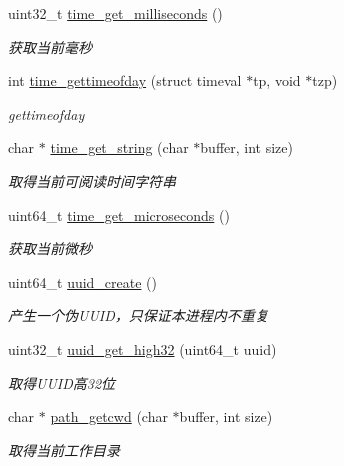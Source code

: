 \begin{DoxyCompactItemize}
uint32\+\_\+t \hyperlink{a00099_a528d27a7218cb2fdabf81ca343e24fc9_a528d27a7218cb2fdabf81ca343e24fc9}{time\+\_\+get\+\_\+milliseconds} ()
\begin{DoxyCompactList}\small\item\em 获取当前毫秒 \end{DoxyCompactList}\item 
int \hyperlink{a00099_a3cab12b4908938ca999206a67c8ee032_a3cab12b4908938ca999206a67c8ee032}{time\+\_\+gettimeofday} (struct timeval $\ast$tp, void $\ast$tzp)
\begin{DoxyCompactList}\small\item\em gettimeofday \end{DoxyCompactList}\item 
char $\ast$ \hyperlink{a00099_a6d3f7fda67a3c61f767f7b2dbfcbe4ee_a6d3f7fda67a3c61f767f7b2dbfcbe4ee}{time\+\_\+get\+\_\+string} (char $\ast$buffer, int size)
\begin{DoxyCompactList}\small\item\em 取得当前可阅读时间字符串 \end{DoxyCompactList}\item 
uint64\+\_\+t \hyperlink{a00099_a5eb6de730bc28be3fbc402b9841c1819_a5eb6de730bc28be3fbc402b9841c1819}{time\+\_\+get\+\_\+microseconds} ()
\begin{DoxyCompactList}\small\item\em 获取当前微秒 \end{DoxyCompactList}\item 
uint64\+\_\+t \hyperlink{a00099_a2b1df51bc127460a3bf25949068bfe92_a2b1df51bc127460a3bf25949068bfe92}{uuid\+\_\+create} ()
\begin{DoxyCompactList}\small\item\em 产生一个伪\+U\+U\+I\+D，只保证本进程内不重复 \end{DoxyCompactList}\item 
uint32\+\_\+t \hyperlink{a00099_a200dc3080cb5e5b5320c9f61ecccd31b_a200dc3080cb5e5b5320c9f61ecccd31b}{uuid\+\_\+get\+\_\+high32} (uint64\+\_\+t uuid)
\begin{DoxyCompactList}\small\item\em 取得\+U\+U\+I\+D高32位 \end{DoxyCompactList}\item 
char $\ast$ \hyperlink{a00099_a6c98a04f00772c05a1f51afc185f7513_a6c98a04f00772c05a1f51afc185f7513}{path\+\_\+getcwd} (char $\ast$buffer, int size)
\begin{DoxyCompactList}\small\item\em 取得当前工作目录 \end{DoxyCompactList}\item 

\end{DoxyCompactItemize}
